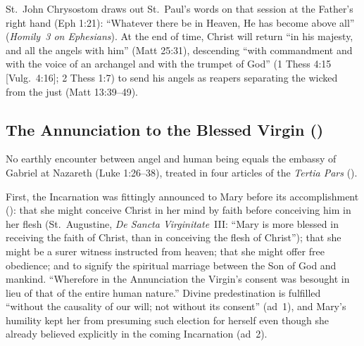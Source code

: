 St.~John Chrysostom draws out St.~Paul's words on that session at the Father's right hand (Eph 1:21): ``Whatever there be in Heaven, He has become above all'' (\emph{Homily~3 on Ephesians}). At the end of time, Christ will return ``in his majesty, and all the angels with him'' (Matt 25:31), descending ``with commandment and with the voice of an archangel and with the trumpet of God'' (1 Thess 4:15 [Vulg.\ 4:16]; 2 Thess 1:7) to send his angels as reapers separating the wicked from the just (Matt 13:39--49).

\subsection{The Annunciation to the Blessed Virgin ()}

No earthly encounter between angel and human being equals the embassy of Gabriel at Nazareth (Luke 1:26--38), treated in four articles of the \emph{Tertia Pars} ().

First, the Incarnation was fittingly announced to Mary before its accomplishment (): that she might conceive Christ in her mind by faith before conceiving him in her flesh (St.~Augustine, \emph{De Sancta Virginitate}~III: ``Mary is more blessed in receiving the faith of Christ, than in conceiving the flesh of Christ''); that she might be a surer witness instructed from heaven; that she might offer free obedience; and to signify the spiritual marriage between the Son of God and mankind. ``Wherefore in the Annunciation the Virgin's consent was besought in lieu of that of the entire human nature.'' Divine predestination is fulfilled ``without the causality of our will; not without its consent'' (ad~1), and Mary's humility kept her from presuming such election for herself even though she already believed explicitly in the coming Incarnation (ad~2).

